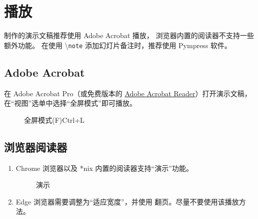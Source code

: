 \documentclass[
    UTF8,
    heading=true,
    12pt,
    a4paper
]{ctexrep}
\newcommand{\cmd}[1]{\textbackslash{}\texttt{#1}}
\begin{document}
\chapter{播放}

制作的演示文稿推荐使用 Adobe Acrobat 播放，
浏览器内置的阅读器不支持一些额外功能。
在使用 \cmd{note} 添加幻灯片备注时，推荐使用 Pympress 软件。

\section{Adobe Acrobat}

在 Adobe Acrobat Pro（或免费版本的
\href{https://www.adobe.com/cn/acrobat/pdf-reader.html}{Adobe Acrobat
Reader}）打开演示文稿，在“视图”选单中选择“全屏模式”即可播放。

\begin{figure}[h]
  \centering
  \begin{tcolorbox}[enhanced, title={视图(V)},
      attach boxed title to top left, boxed title
      style={sharp corners}, sharp corners, tile,
      width=6cm]
    \faTv{} 全屏模式(F)\hfill Ctrl+L
  \end{tcolorbox}
\end{figure}

\section{浏览器阅读器}

\begin{enumerate}
  \item[\faChrome] Chrome 浏览器以及 *nix
        内置的阅读器支持“演示”功能。
        \begin{figure}[h]
          \centering
          \begin{tcolorbox}[enhanced,
              title={$\vdots$}, attach boxed
              title to top
              right, boxed title style={
                  circular arc, top=0mm,
                  bottom=2mm,
                  left=3.25mm, right=3.25mm
                },
              sharp corners, tile, width=6cm]
            演示
          \end{tcolorbox}
        \end{figure}
  \item[\faInternetExplorer] Edge
        浏览器需要调整为“适应宽度”\fbox{\faArrowsAltH}，并使用
         翻页。尽量不要使用该播放方法。
\end{enumerate}
\end{document}
